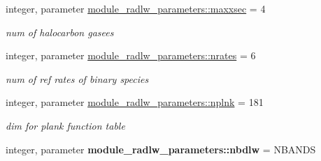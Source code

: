 \begin{Indent}
\begin{DoxyCompactItemize}
\mbox{\label{namespacemodule__radlw__parameters_a5817221936731c6ee6443da6a64e934e}} 
integer, parameter \hyperlink{namespacemodule__radlw__parameters_a5817221936731c6ee6443da6a64e934e}{module\+\_\+radlw\+\_\+parameters\+::maxxsec} = 4
\begin{DoxyCompactList}\small\item\em num of halocarbon gasees \end{DoxyCompactList}\item 
\mbox{\label{namespacemodule__radlw__parameters_a86288e4bbe3d6962505488790ff42bfa}} 
integer, parameter \hyperlink{namespacemodule__radlw__parameters_a86288e4bbe3d6962505488790ff42bfa}{module\+\_\+radlw\+\_\+parameters\+::nrates} = 6
\begin{DoxyCompactList}\small\item\em num of ref rates of binary species \end{DoxyCompactList}\item 
\mbox{\label{namespacemodule__radlw__parameters_a7ade2de4de94ec6e7a0e97321143e2e6}} 
integer, parameter \hyperlink{namespacemodule__radlw__parameters_a7ade2de4de94ec6e7a0e97321143e2e6}{module\+\_\+radlw\+\_\+parameters\+::nplnk} = 181
\begin{DoxyCompactList}\small\item\em dim for plank function table \end{DoxyCompactList}\item 
\mbox{\label{namespacemodule__radlw__parameters_a39a115a97296886b2e6e37b220e942c7}} 
integer, parameter {\bfseries module\+\_\+radlw\+\_\+parameters\+::nbdlw} = N\+B\+A\+N\+DS
\end{DoxyCompactItemize}
\end{Indent}
